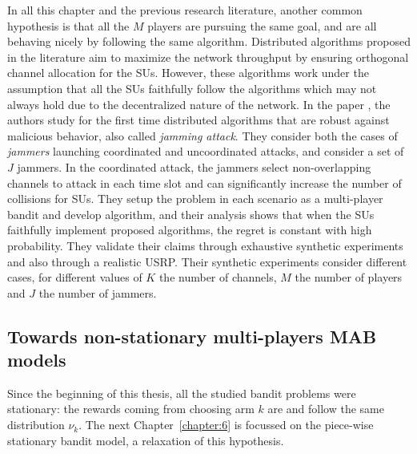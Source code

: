 In all this chapter and the previous research literature, another common hypothesis is that all the $M$ players are pursuing the same goal, and are all behaving nicely by following the same algorithm.
Distributed algorithms proposed in the literature aim to maximize the network throughput by ensuring orthogonal channel allocation for the SUs.
However, these algorithms work under the assumption that all the SUs faithfully follow the algorithms which may not always hold due to the decentralized nature of the network.
In the paper \cite{SawantKumar2018}, the authors study for the first time distributed algorithms that are robust against malicious behavior, also called \emph{jamming attack}.
They consider both the cases of \emph{jammers} launching coordinated and uncoordinated attacks, and consider a set of $J$ jammers.
In the coordinated attack, the jammers select non-overlapping channels to attack in each time slot and can significantly increase the number of collisions for SUs.
They setup the problem in each scenario as a multi-player bandit and develop algorithm,
and their analysis shows that when the SUs faithfully implement proposed algorithms, the regret is constant with high probability.
They validate their claims through exhaustive synthetic experiments and also through a realistic USRP.
Their synthetic experiments consider different cases, for different values of $K$ the number of channels, $M$ the number of players and $J$ the number of jammers.



\subsection{Towards non-stationary multi-players MAB models}
\label{sub:5:towardsNonStationaryModels}

Since the beginning of this thesis, all the studied bandit problems were stationary: the rewards coming from choosing arm $k$ are \iid{} and follow the same distribution $\nu_k$.
The next Chapter~\ref{chapter:6} is focussed on the piece-wise stationary bandit model, a relaxation of this hypothesis.

